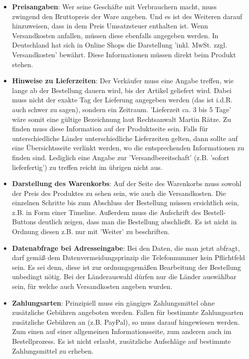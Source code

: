 \documentclass[a4paper]{article}
\begin{document}
\begin{itemize}
\item \textbf{Preisangaben}: Wer seine Geschäfte mit Verbrauchern macht, muss zwingend den Bruttopreis der Ware angeben. Und es ist des Weiteren darauf hinzuweisen, dass in dem Preis Umsatzsteuer enthalten ist. Wenn Versandkosten anfallen, müssen diese ebenfalls angegeben werden. In Deutschland hat sich in Online Shops die Darstellung 'inkl. MwSt. zzgl. Versandkosten' bewährt. Diese Informationen müssen direkt beim Produkt stehen.
\item \textbf{Hinweise zu Lieferzeiten}: Der Verkäufer muss eine Angabe treffen, wie lange ab der Bestellung dauern wird, bis der Artikel geliefert wird. Dabei muss nicht der exakte Tag der Lieferung angegeben werden (das ist i.d.R. auch schwer zu sagen), sondern ein Zeitraum. 'Lieferzeit ca. 3 bis 5 Tage' wäre somit eine gültige Bezeichnung laut Rechtsanwalt Martin Rätze. Zu finden muss diese Information auf der Produktseite sein. Falls für unterschiedliche Länder unterschiedliche Lieferzeiten gelten, dann sollte auf eine Übersichtsseite verlinkt werden, wo die entsprechenden Informationen zu finden sind. Lediglich eine Angabe zur 'Versandbereitschaft' (z.B. 'sofort lieferfertig') zu treffen reicht im übrigen nicht aus.
\item \textbf{Darstellung des Warenkorbs}: Auf der Seite des Warenkorbs muss sowohl der Preis des Produktes zu sehen sein, wie auch die Versandkosten. Die einzelnen Schritte bis zum Abschluss der Bestellung müssen ersichtlich sein, z.B. in Form einer Timeline. Außerdem muss die Aufschrift des Bestell-Buttons deutlich zeigen, dass man die Bestellung abschließt. Es ist nicht in Ordnung diesen z.B. nur mit 'Weiter' zu beschriften.
\item \textbf{Datenabfrage bei Adresseingabe}: Bei den Daten, die man jetzt abfragt, darf gemäß dem Datenvermeidungsprinzip die Telefonnummer kein Pflichtfeld sein. Es sei denn, diese ist zur ordnungsgemäßen Bearbeitung der Bestellung unbedingt nötig. Bei der Länderauswahl dürfen nur die Länder auswählbar sein, für welche auch Versandkosten angeben wurden.
\item \textbf{Zahlungsarten}: Prinzipiell muss ein gängiges Zahlungsmittel ohne zusätzliche Gebühren angeboten werden. Fallen für bestimmte Zahlungsarten zusätzliche Gebühren an (z.B. PayPal), so muss darauf hingewiesen werden. Zum einen auf einer allgemeinen Informationsseite, zum anderen auch im Bestellprozess. Es ist nicht erlaubt, zusätzliche Aufschläge auf bestimmte Zahlungsmittel zu erheben.

\end{itemize}
\end{document}
